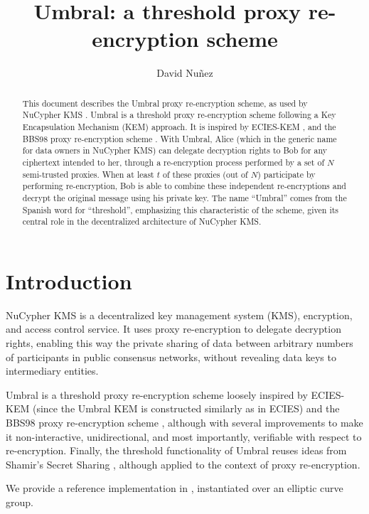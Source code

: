 \documentclass{amsart}
\title{Umbral: a threshold proxy re-encryption scheme}
\author{David Nuñez}
\date{} %
\begin{document}
\maketitle

\begin{abstract}
This document describes the Umbral proxy re-encryption scheme, as used by NuCypher KMS \cite{egorov2017nucypherkms}. 
Umbral is a threshold proxy re-encryption scheme following a Key Encapsulation Mechanism (KEM) approach. It is inspired by ECIES-KEM \cite{ansi-x9.63}, and the BBS98 proxy re-encryption scheme \cite{blaze1998divertible}. 
With Umbral, Alice (which in the generic name for data owners in NuCypher KMS) can delegate decryption rights to Bob for any ciphertext intended to her, through a re-encryption process performed by a set of $N$ semi-trusted proxies. When at least $t$ of these proxies (out of $N$) participate by performing re-encryption, Bob is able to combine these independent re-encryptions and decrypt the original message using his private key. 
The name ``Umbral'' comes from the Spanish word for ``threshold'', emphasizing this characteristic of the scheme, given its central role in the decentralized architecture of NuCypher KMS. 
\end{abstract}



\section{Introduction}

NuCypher KMS \cite{egorov2017nucypherkms} is a decentralized key management system (KMS), encryption, and access control service. 
It uses proxy re-encryption to delegate decryption rights, enabling this way the private sharing of data between arbitrary numbers of participants in public consensus networks, without revealing data keys to intermediary entities. 

Umbral is a threshold proxy re-encryption scheme loosely inspired by ECIES-KEM \cite{ansi-x9.63} (since the Umbral KEM is constructed similarly as in ECIES) and the BBS98 proxy re-encryption scheme \cite{blaze1998divertible}, although with several improvements to make it non-interactive, unidirectional, and most importantly, verifiable with respect to re-encryption. Finally, the threshold functionality of Umbral reuses ideas from Shamir's Secret Sharing \cite{shamir1979share}, although applied to the context of proxy re-encryption. 

We provide a reference implementation in \cite{pyumbral}, instantiated over an elliptic curve group.
\end{document}
